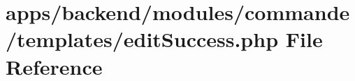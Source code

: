 \hypertarget{backend_2modules_2commande_2templates_2edit_success_8php}{\section{apps/backend/modules/commande/templates/edit\-Success.php File Reference}
\label{backend_2modules_2commande_2templates_2edit_success_8php}
}
